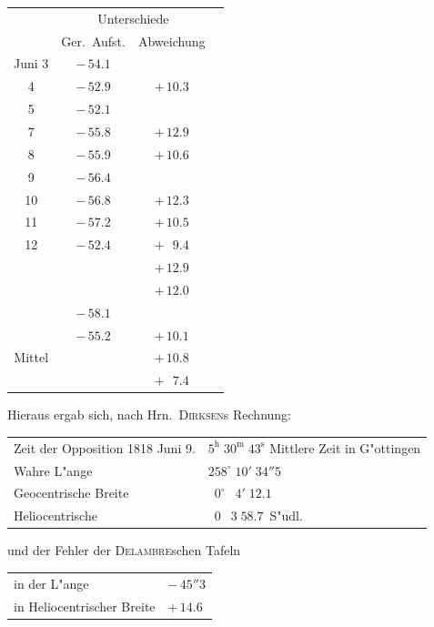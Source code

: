 \documentclass[12pt,a4paper]{article}
\begin{document}
\begin{center}
\small
\begin{tabular}{c|c|c|c}
\toprule
& \multicolumn{2}{c|}{Unterschiede} & \\
& Ger.~Aufst. & Abweichung & \\
\midrule
Juni \phantom{0}3 & $-\,54.1$ & & \\
\phantom{0}\phantom{0} 4 & $-\,52.9$ & $+\,10.3$ & \\
\phantom{0}\phantom{0} 5 & $-\,52.1$ & & \\
\phantom{0}\phantom{0} 7 & $-\,55.8$ & $+\,12.9$ & \\
\phantom{0}\phantom{0} 8 & $-\,55.9$ & $+\,10.6$ & \\
\phantom{0}\phantom{0} 9 & $-\,56.4$ & & \\
\phantom{0}\phantom{0} 10 & $-\,56.8$ & $+\,12.3$ & \\
\phantom{0}\phantom{0} 11 & $-\,57.2$ & $+\,10.5$ & \\
\phantom{0}\phantom{0} 12 & $-\,52.4$ & $+\,\phantom{0}9.4$ & \\
\midrule
& & $+\,12.9$ & \\
& & $+\,12.0$ & \\
& $-\,58.1$ & & \\
& $-\,55.2$ & $+\,10.1$ & \\
\midrule
Mittel & & $+\,10.8$ & \\
& & $+\,\phantom{0}7.4$ & \\
\bottomrule
\end{tabular}
\end{center}

Hieraus ergab sich, nach Hrn.~\textsc{Dirksen}s Rechnung:

\begin{center}
\begin{tabular}{l@{\quad}l}
Zeit der Opposition 1818 Juni 9. & $5^{\mathrm{h}}\;30^{\mathrm{m}}\;43^{\mathrm{s}}$ Mittlere Zeit in G"ottingen \\
Wahre L"ange \dotfill & $258^{\circ}\;10'\;34''5$ \\
Geocentrische Breite \dotfill & $\phantom{0}0^{\circ}\;\phantom{0}4'\;12.1$ \\
Heliocentrische \dotfill & $\phantom{0}0\;\phantom{0}3\;58.7$~S"udl.
\end{tabular}
\end{center}

und der Fehler der \textsc{Delambre}schen Tafeln
\begin{center}
\begin{tabular}{l@{\dotfill}l}
in der L"ange & $-\,45''3$ \\
in Heliocentrischer Breite & $+\,14.6$ \\
\end{tabular}
\end{center}
\end{document}
